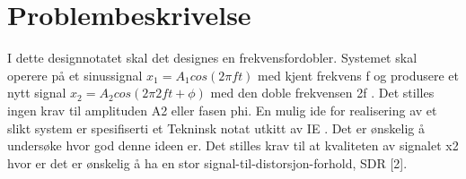 \section{Problembeskrivelse}
\label{problemBeskrivelse}

I dette designnotatet skal det designes en frekvensfordobler. Systemet skal operere på et sinussignal $x_1 = A_1 cos(2\pi f t)$ med kjent frekvens f og produsere et nytt signal $x_2 = A_2 cos(2\pi 2f t+\phi)$ med den doble frekvensen 2f . Det stilles ingen krav til amplituden A2 eller fasen phi. En mulig ide for realisering av et slikt system er spesifiserti et Tekninsk notat utkitt av IE \cite{Tek_notat}. Det er ønskelig å undersøke hvor god denne ideen er. Det stilles krav til at kvaliteten av signalet x2 hvor er det er ønskelig å ha en stor signal-til-distorsjon-forhold, SDR [2].